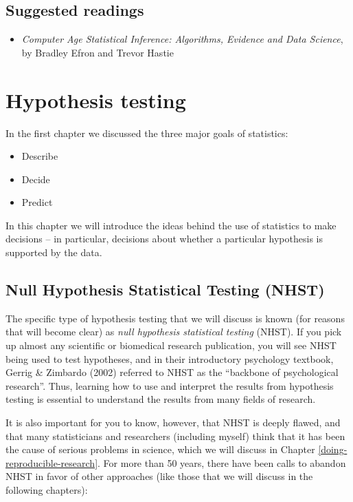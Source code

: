 \documentclass[12pt,]{book}
\providecommand{\tightlist}{%
  \setlength{\itemsep}{0pt}\setlength{\parskip}{0pt}}
\theoremstyle{definition}
\theoremstyle{definition}
\theoremstyle{definition}
\theoremstyle{remark}
\begin{document}
\hypertarget{suggested-readings-5}{%
\section{Suggested readings}\label{suggested-readings-5}}

\begin{itemize}
\tightlist
\item
  \emph{Computer Age Statistical Inference: Algorithms, Evidence and Data Science}, by Bradley Efron and Trevor Hastie
\end{itemize}

\hypertarget{hypothesis-testing}{%
\chapter{Hypothesis testing}\label{hypothesis-testing}}

In the first chapter we discussed the three major goals of statistics:

\begin{itemize}
\tightlist
\item
  Describe
\item
  Decide
\item
  Predict
\end{itemize}

In this chapter we will introduce the ideas behind the use of statistics to make decisions -- in particular, decisions about whether a particular hypothesis is supported by the data.

\hypertarget{null-hypothesis-statistical-testing-nhst}{%
\section{Null Hypothesis Statistical Testing (NHST)}\label{null-hypothesis-statistical-testing-nhst}}

The specific type of hypothesis testing that we will discuss is known (for reasons that will become clear) as \emph{null hypothesis statistical testing} (NHST). If you pick up almost any scientific or biomedical research publication, you will see NHST being used to test hypotheses, and in their introductory psychology textbook, Gerrig \& Zimbardo (2002) referred to NHST as the ``backbone of psychological research''. Thus, learning how to use and interpret the results from hypothesis testing is essential to understand the results from many fields of research.

It is also important for you to know, however, that NHST is deeply flawed, and that many statisticians and researchers (including myself) think that it has been the cause of serious problems in science, which we will discuss in Chapter \ref{doing-reproducible-research}. For more than 50 years, there have been calls to abandon NHST in favor of other approaches (like those that we will discuss in the following chapters):
\end{document}
